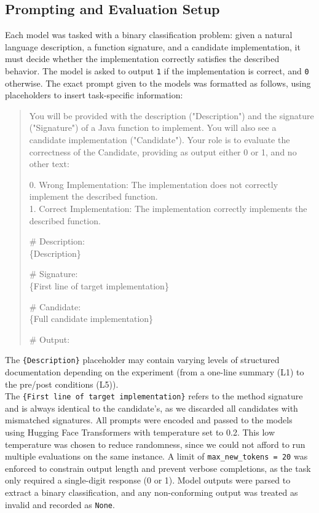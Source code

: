 \documentclass[a4paper]{usiinfbachelorproject}
\begin{document}
\subsection{Prompting and Evaluation Setup}\label{sec:evaluation}
Each model was tasked with a binary classification problem: given a natural language description, a function signature, and a candidate implementation, it must decide whether the implementation correctly satisfies the described behavior. The model is asked to output \texttt{1} if the implementation is correct, and \texttt{0} otherwise.
The exact prompt given to the models was formatted as follows, using placeholders to insert task-specific information:

\begin{quote}\ttfamily
You will be provided with the description ("Description") and the signature ("Signature") of a Java function to implement. You will also see a candidate implementation ("Candidate"). Your role is to evaluate the correctness of the Candidate, providing as output either 0 or 1, and no other text:

0. Wrong Implementation: The implementation does not correctly implement the described function.\\
1. Correct Implementation: The implementation correctly implements the described function.

\# Description:\\
\{Description\}

\# Signature:\\
\{First line of target implementation\}

\# Candidate:\\
\{Full candidate implementation\}

\# Output:
\end{quote}
The \texttt{\{Description\}} placeholder may contain varying levels of structured documentation depending on the experiment (from a one-line summary (L1) to the pre/post conditions (L5)).\\
The \texttt{\{First line of target implementation\}} refers to the method signature and is always identical to the candidate’s, as we discarded all candidates with mismatched signatures.
All prompts were encoded and passed to the models using Hugging Face Transformers with temperature set to 0.2. This low temperature was chosen to reduce randomness, since we could not afford to run multiple evaluations on the same instance. A limit of \texttt{max\_new\_tokens = 20} was enforced to constrain output length and prevent verbose completions, as the task only required a single-digit response (0 or 1). Model outputs were parsed to extract a binary classification, and any non-conforming output was treated as invalid and recorded as \texttt{None}.\\
\end{document}
